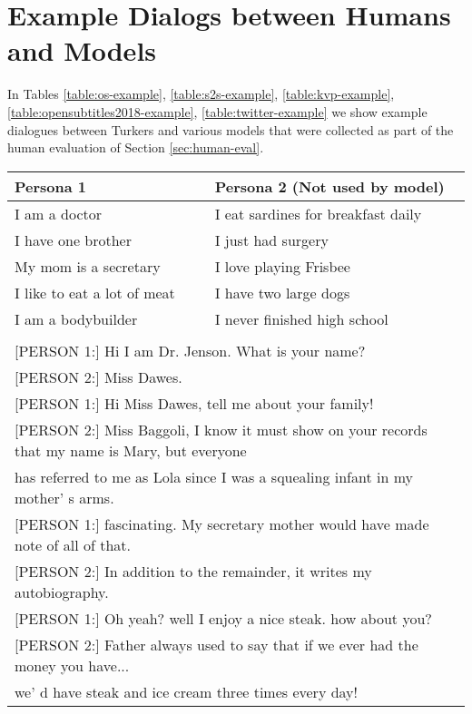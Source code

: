 \documentclass[11pt,a4paper]{article}
\begin{document}
\section{Example Dialogs between Humans and Models}

In Tables \ref{table:os-example}, \ref{table:s2s-example}, \ref{table:kvp-example}, 
 \ref{table:opensubtitles2018-example}, \ref{table:twitter-example}
we show  example dialogues between Turkers
and various models that were collected as part of the human evaluation of Section \ref{sec:human-eval}.

\begin{table*}[t]
  \begin{center}
    \begin{small}
      \begin{tabular}{l|l}
        \toprule
        \textbf{Persona 1} & \textbf{Persona 2 (Not used by model)}\\
        \midrule
I am a doctor &  I eat sardines for breakfast daily \\
I have one brother & I just had surgery\\
My mom is a secretary & I love playing Frisbee \\
I like to eat a lot of meat & I have two large dogs \\
I am a bodybuilder & I never finished high school \\
\bottomrule
\multicolumn{2}{l}{ }\\
\multicolumn{2}{l}{[PERSON 1:] Hi I am Dr. Jenson. What is your name?}\\
\multicolumn{2}{l}{[PERSON 2:] Miss Dawes.}\\
\multicolumn{2}{l}{[PERSON 1:] Hi Miss Dawes, tell me about your family!}\\
\multicolumn{2}{l}{[PERSON 2:] Miss Baggoli, I know it must show on your records that my name is Mary, but everyone} \\\multicolumn{2}{l}{has referred to me as Lola since I was a squealing infant in my mother' s arms. }\\
\multicolumn{2}{l}{[PERSON 1:] fascinating. My secretary mother would have made note of all of that.}\\
\multicolumn{2}{l}{[PERSON 2:] In addition to the remainder, it writes my autobiography.}\\
\multicolumn{2}{l}{[PERSON 1:] Oh yeah? well I enjoy a nice steak. how about you?}\\
\multicolumn{2}{l}{[PERSON 2:] Father always used to say that if we ever had the money you have...}\\ \multicolumn{2}{l}{we' d have steak and ice cream three times every day!}\\

\end{tabular}
\end{small}
\end{center}
\end{table*}
\end{document}
